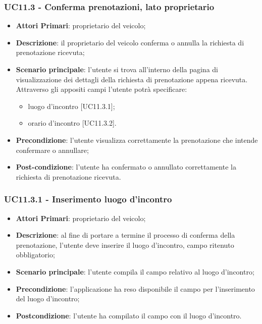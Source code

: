 \subsubsection{UC11.3 - Conferma prenotazioni, lato proprietario}
\begin{itemize}
	\item \textbf{Attori Primari}: proprietario del veicolo;
	\item \textbf{Descrizione}: il proprietario del veicolo conferma o annulla la richiesta di prenotazione ricevuta;
	\item \textbf{Scenario principale}: l'utente si trova all'interno della pagina di visualizzazione dei dettagli della richiesta di prenotazione appena ricevuta. Attraverso gli appositi campi l'utente potrà specificare:
	\begin{itemize}
		\item luogo d'incontro [UC11.3.1];
		\item orario d'incontro [UC11.3.2].
	\end{itemize} 
	\item \textbf{Precondizione}: l'utente visualizza correttamente la prenotazione che intende confermare o annullare;
	\item \textbf{Post-condizione}: l'utente ha confermato o annullato correttamente la richiesta di prenotazione ricevuta.
\end{itemize}

\subsubsection{UC11.3.1 - Inserimento luogo d'incontro}
\begin{itemize}
	\item \textbf{Attori Primari}: proprietario del veicolo;
	\item \textbf{Descrizione}: al fine di portare a termine il processo di conferma della prenotazione, l'utente deve inserire il luogo d'incontro, campo ritenuto obbligatorio;
	\item \textbf{Scenario principale}: l'utente compila il campo relativo al luogo d'incontro;	
	\item \textbf{Precondizione}: l'applicazione ha reso disponibile il campo per l'inserimento del luogo d'incontro;
	\item \textbf{Postcondizione}: l'utente ha compilato il campo con il luogo d'incontro.	
\end{itemize}

